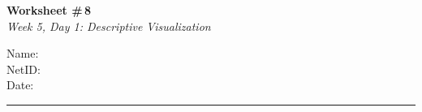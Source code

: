 \documentclass[11pt]{article}
\begin{document}
\noindent
\begin{minipage}[t]{0.55\textwidth}
  \vspace{0pt}
  {\LARGE \textbf{Worksheet \#\,8}} \\[0.3em]
  {\large \textit{Week 5, Day 1: Descriptive Visualization}}
\end{minipage}
\hfill
\begin{minipage}[t]{0.40\textwidth}
  \vspace{0pt}
  \begin{mdframed}[linecolor=black, linewidth=1pt, innertopmargin=10pt, innerbottommargin=10pt]
    \small
    \vspace{0.4cm}
    Name: \underline{\hspace{4.5cm}} \\[1em]
    NetID: \underline{\hspace{4.3cm}} \\[1em]
    Date: \underline{\hspace{4.4cm}} \\
  \end{mdframed}
\end{minipage}

\vspace{1em}
\noindent\rule{\linewidth}{1pt}
\vspace{0.2em}
\end{document}
